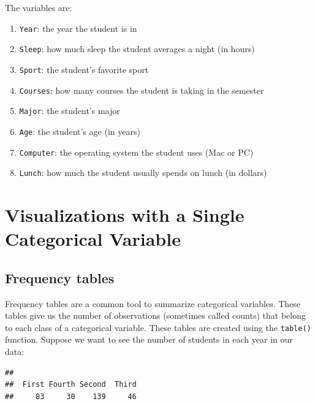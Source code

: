 \documentclass[
]{book}
\newenvironment{Shaded}{\begin{snugshade}}{\end{snugshade}}
\newcommand{\FunctionTok}[1]{\textcolor[rgb]{0.13,0.29,0.53}{\textbf{#1}}}
\newcommand{\NormalTok}[1]{#1}
\newcommand{\SpecialCharTok}[1]{\textcolor[rgb]{0.81,0.36,0.00}{\textbf{#1}}}
\providecommand{\tightlist}{%
  \setlength{\itemsep}{0pt}\setlength{\parskip}{0pt}}
\begin{document}
The variables are:

\begin{enumerate}
\def\labelenumi{\arabic{enumi}.}
\tightlist
\item
  \texttt{Year}: the year the student is in
\item
  \texttt{Sleep}: how much sleep the student averages a night (in hours)
\item
  \texttt{Sport}: the student's favorite sport
\item
  \texttt{Courses}: how many courses the student is taking in the semester
\item
  \texttt{Major}: the student's major
\item
  \texttt{Age}: the student's age (in years)
\item
  \texttt{Computer}: the operating system the student uses (Mac or PC)
\item
  \texttt{Lunch}: how much the student usually spends on lunch (in dollars)
\end{enumerate}

\hypertarget{visualizations-with-a-single-categorical-variable}{%
\section{Visualizations with a Single Categorical Variable}\label{visualizations-with-a-single-categorical-variable}}

\hypertarget{frequency-tables}{%
\subsection{Frequency tables}\label{frequency-tables}}

Frequency tables are a common tool to summarize categorical variables. These tables give us the number of observations (sometimes called counts) that belong to each class of a categorical variable. These tables are created using the \texttt{table()} function. Suppose we want to see the number of students in each year in our data:

\begin{Shaded}
\end{Shaded}

\begin{verbatim}
## 
##  First Fourth Second  Third 
##     83     30    139     46
\end{verbatim}
\end{document}
